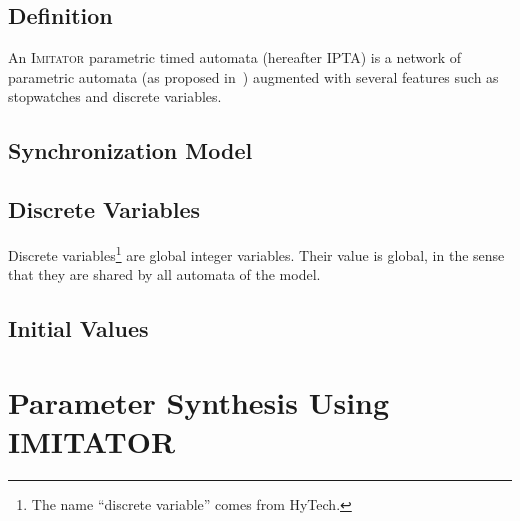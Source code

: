 \documentclass[a4paper,11pt]{article}
\newcommand{\hytech}{{\sc HyTech}}
\newcommand{\imitator}{\textsc{Imitator}}
\newcommand{\IPTA}{IPTA}
\begin{document}
\subsection{Definition}


An \imitator{} parametric timed automata (hereafter \IPTA{}) is a network of parametric automata (as proposed in~\cite{AHV93}) augmented with several features such as stopwatches and discrete variables.



\subsection{Synchronization Model}


\subsection{Discrete Variables}

Discrete variables\footnote{%
	The name ``discrete variable'' comes from \hytech{}.
}
are global integer variables.
Their value is global, in the sense that they are shared by all automata of the model.

\subsection{Initial Values}



\section{Parameter Synthesis Using IMITATOR}



\end{document}
